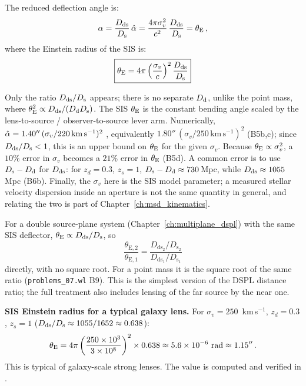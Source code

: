 The reduced deflection angle is:
\begin{equation}
    \alpha = \frac{D_{\mathrm{ds}}}{D_{\mathrm{s}}}\, \hat{\alpha}
    = \frac{4\pi\sigma_v^2}{c^2}\,
    \frac{D_{\mathrm{ds}}}{D_{\mathrm{s}}} = \theta_{\mathrm{E}} \,,
    \label{eq:sis_alpha_reduced}
\end{equation}
where the Einstein radius of the SIS is:
\begin{equation}
    \boxed{
    \theta_{\mathrm{E}} = 4\pi\left(\frac{\sigma_v}{c}\right)^2
    \frac{D_{\mathrm{ds}}}{D_{\mathrm{s}}}
    }
    \label{eq:sis_einstein_radius}
\end{equation}

\begin{annotation}
Only the ratio $D_{\mathrm{ds}}/D_{\mathrm{s}}$ appears; there is no separate $D_{\mathrm{d}}$, unlike the
point mass, where $\theta_{\mathrm{E}}^2\propto D_{\mathrm{ds}}/(D_{\mathrm{d}}D_{\mathrm{s}})$.  The SIS $\theta_{\mathrm{E}}$ is the
constant bending angle scaled by the lens-to-source / observer-to-source
lever arm.  Numerically,
$\hat{\alpha} = 1.40''\,(\sigma_v/220\,\mathrm{km\,s^{-1}})^2$
\citep[eq.~44]{narayan_lectures_1997}, equivalently
$1.80''\,(\sigma_v/250\,\mathrm{km\,s^{-1}})^2$ (B5b,c); since $D_{\mathrm{ds}}/D_{\mathrm{s}}<1$,
this is an upper bound on $\theta_{\mathrm{E}}$ for the given $\sigma_v$.  Because
$\theta_{\mathrm{E}}\propto\sigma_v^2$, a $10\%$ error in $\sigma_v$ becomes a $21\%$
error in $\theta_{\mathrm{E}}$ (B5d).  A common error is to use $D_{\mathrm{s}}-D_{\mathrm{d}}$ for $D_{\mathrm{ds}}$:
for $z_d=0.3$, $z_s=1$, $D_{\mathrm{s}}-D_{\mathrm{d}}\approx730$\,Mpc, while
$D_{\mathrm{ds}}\approx1055$\,Mpc (B6b).  Finally, the $\sigma_v$ here is the SIS
model parameter; a measured stellar velocity dispersion inside an aperture
is not the same quantity in general, and relating the two is part of
Chapter~\ref{ch:msd_kinematics}.
\end{annotation}

\begin{bridge}
For a double source-plane system (Chapter~\ref{ch:multiplane_dspl}) with the
same SIS deflector, $\theta_{\mathrm{E}}\propto D_{\mathrm{ds}}/D_{\mathrm{s}}$, so
\[
  \frac{\theta_{\mathrm{E},2}}{\theta_{\mathrm{E},1}}
  = \frac{D_{\mathrm{ds}_2}/D_{\mathrm{s}_2}}{D_{\mathrm{ds}_1}/D_{\mathrm{s}_1}}
\]
directly, with no square root.  For a point mass it is the square root of the
same ratio (\texttt{problems\_07.wl} B9).  This is the simplest version of
the DSPL distance ratio; the full treatment also includes lensing of the far
source by the near one.
\end{bridge}

\begin{example}
\textbf{SIS Einstein radius for a typical galaxy lens.}
For $\sigma_v = 250$~km\,s$^{-1}$, $z_d = 0.3$, $z_s = 1$
($D_{\mathrm{ds}}/D_{\mathrm{s}} \approx 1055/1652 \approx 0.638$):
\begin{equation}
    \theta_{\mathrm{E}} = 4\pi\left(\frac{250 \times 10^3}{3 \times 10^8}\right)^2
    \times 0.638
    \approx 5.6 \times 10^{-6}~\text{rad}
    \approx 1.15'' \,.
    \label{eq:sis_thetaE_numerical}
\end{equation}
This is typical of galaxy-scale strong lenses.  The value is computed
and verified in
.
\end{example}

